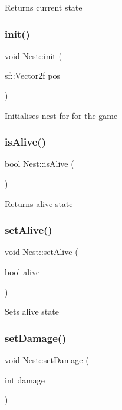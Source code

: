 Returns current state \mbox{\label{class_nest_a1b243050144c8b5200bd3e8a4370565a}} 
\subsubsection{\texorpdfstring{init()}{init()}}
{\footnotesize\ttfamily void Nest\+::init (\begin{DoxyParamCaption}\item[{sf\+::\+Vector2f}]{pos }\end{DoxyParamCaption})}

Initialises nest for for the game \mbox{\label{class_nest_a3f0d0175e349409ef2cab7e9bae0fb81}} 
\subsubsection{\texorpdfstring{is\+Alive()}{isAlive()}}
{\footnotesize\ttfamily bool Nest\+::is\+Alive (\begin{DoxyParamCaption}{ }\end{DoxyParamCaption})}

Returns alive state \mbox{\label{class_nest_a122840333f4f0d0f5acd2815b0f633ca}} 
\subsubsection{\texorpdfstring{set\+Alive()}{setAlive()}}
{\footnotesize\ttfamily void Nest\+::set\+Alive (\begin{DoxyParamCaption}\item[{bool}]{alive }\end{DoxyParamCaption})}

Sets alive state \mbox{\label{class_nest_a2a5904049fbb094af9f79ec55a5be9d6}} 
\subsubsection{\texorpdfstring{set\+Damage()}{setDamage()}}
{\footnotesize\ttfamily void Nest\+::set\+Damage (\begin{DoxyParamCaption}\item[{int}]{damage }\end{DoxyParamCaption})}

